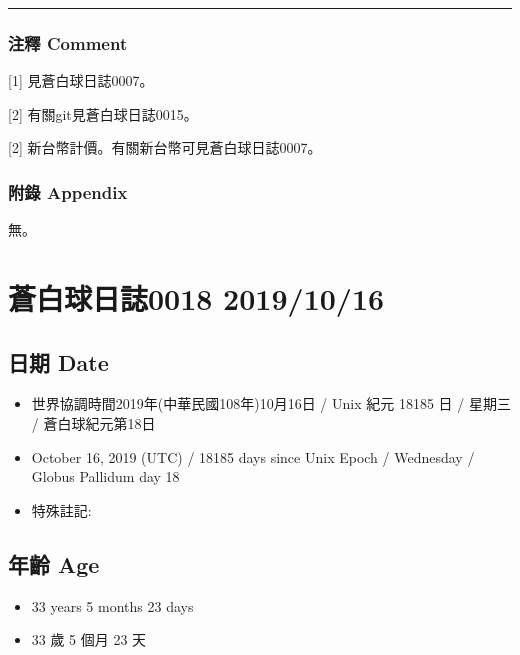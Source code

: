 \documentclass[
]{article}
\providecommand{\tightlist}{%
  \setlength{\itemsep}{0pt}\setlength{\parskip}{0pt}}
\begin{document}
\begin{center}\rule{0.5\linewidth}{\linethickness}\end{center}

\hypertarget{ux6ce8ux91cb-comment-10}{%
\subsubsection{注釋 Comment}\label{ux6ce8ux91cb-comment-10}}

{[}1{]} 見蒼白球日誌0007。

{[}2{]} 有關git見蒼白球日誌0015。

{[}2{]} 新台幣計價。有關新台幣可見蒼白球日誌0007。

\hypertarget{ux9644ux9304-appendix-9}{%
\subsubsection{附錄 Appendix}\label{ux9644ux9304-appendix-9}}

無。

\hypertarget{ux84bcux767dux7403ux65e5ux8a8c0018-20191016}{%
\section{蒼白球日誌0018
2019/10/16}\label{ux84bcux767dux7403ux65e5ux8a8c0018-20191016}}

\hypertarget{ux65e5ux671f-date-17}{%
\subsection{日期 Date}\label{ux65e5ux671f-date-17}}

\begin{itemize}
\tightlist
\item
  世界協調時間2019年(中華民國108年)10月16日 / Unix 紀元 18185 日 /
  星期三 / 蒼白球紀元第18日
\item
  October 16, 2019 (UTC) / 18185 days since Unix Epoch / Wednesday /
  Globus Pallidum day 18
\item
  特殊註記:
\end{itemize}

\hypertarget{ux5e74ux9f61-age-17}{%
\subsection{年齡 Age}\label{ux5e74ux9f61-age-17}}

\begin{itemize}
\tightlist
\item
  33 years 5 months 23 days
\item
  33 歲 5 個月 23 天
\end{itemize}
\end{document}
